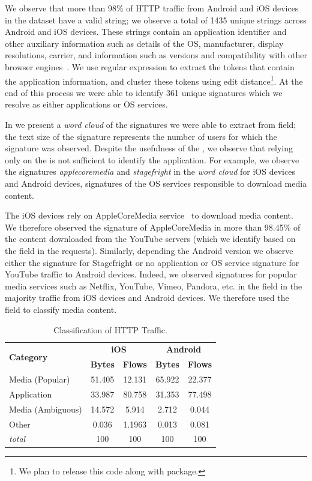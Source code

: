 We observe that more than 98\% of HTTP traffic from Android and iOS devices in the \mobWild dataset have a valid \useragent string; we observe a total of 1435 unique \useragent strings across Android and iOS devices. 
These \useragent strings contain an application identifier and other auxiliary information such as details of the OS, manufacturer, display resolutions, carrier, and information such as versions and compatibility with other browser engines~\cite{mozilla:useragentdetection}. 
We use regular expression to extract the tokens that contain the application information, and cluster these tokens using edit distance\footnote{We plan to release this code along with \platname package.}.
At the end of this process we were able to identify 361 unique signatures which we resolve as either applications or OS services. 

In  we present a \emph{word cloud} of the signatures we were able to extract from \useragent field; the text size of the signature represents the number of users for which the signature was observed.
Despite the usefulness of the \useragent, we observe that relying only on the \useragent is not sufficient to identify the application.
For example, we observe the signatures \emph{applecoremedia} and \emph{stagefright} in the \emph{word cloud} for iOS devices and Android devices, signatures of the OS services responsible to download media content.

The iOS devices rely on AppleCoreMedia service~\cite{apple:coremedia} to download media content.
We therefore observed the signature of AppleCoreMedia in more than 98.45\% of the content downloaded from the YouTube servers (which we identify based on the \httphost field in the \httpget requests). 
Similarly, depending the Android version we observe either the signature for Stagefright\cite{android:stagefright} or no application or OS service signature for YouTube traffic to Android devices. 
Indeed, we observed signatures for popular media services such as Netflix, YouTube, Vimeo, Pandora, etc. in the \httphost field in the majority traffic from iOS devices and Android devices. 
We therefore used the \httphost field to classify media content.

\begin{table}
\centering
\begin{small}
\begin{tabular}{|p{}|c|c|c|c|}
\hline
\multirow{2}{*}{\bf Category} & \multicolumn{2}{c|}{\bf iOS} &  \multicolumn{2}{c|}{\bf Android} \tabularnewline
\cline{2-5}
  & {\bf Bytes}  & {\bf Flows} & {\bf Bytes} & {\bf Flows}   \tabularnewline
\hline
Media (Popular)         & 51.405  & 12.131 & 65.922 & 22.377 \tabularnewline
\hline
Application             & 33.987  & 80.758 & 31.353 & 77.498 \tabularnewline
\hline
Media (Ambiguous)       & 14.572  &  5.914 &  2.712 &  0.044 \tabularnewline
\hline
Other                   &  0.036  & 1.1963 &  0.013 &  0.081 \tabularnewline
\hline
{\em total}            & 100 & 100 & 100 & 100 \tabularnewline
\hline
\end{tabular}
\end{small}
\caption{Classification of HTTP Traffic.}
\label{tab:classify-http}
\end{table}

